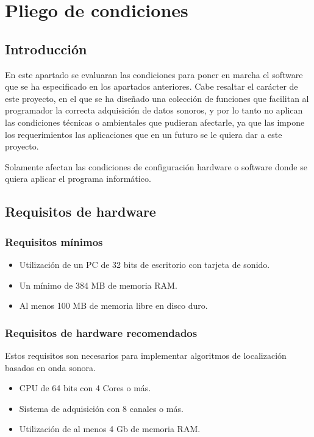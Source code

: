 \chapter{Pliego de condiciones}
\label{cha:pliego-de-condiciones}

\section{Introducción}

En este apartado se evaluaran las condiciones para poner en marcha el software que se ha especificado en los apartados anteriores. Cabe resaltar el carácter de este proyecto, en el que se ha diseñado una colección de funciones que facilitan al programador la correcta adquisición de datos sonoros, y por lo tanto no aplican las condiciones técnicas o ambientales que pudieran afectarle, ya que las impone los requerimientos las aplicaciones que en un futuro se le quiera dar a este proyecto.

Solamente afectan las condiciones de configuración hardware o software donde se quiera aplicar el programa informático.

\section{Requisitos de hardware}

\subsection{Requisitos mínimos}
\begin{itemize}
  \item Utilización de un PC de 32 bits de escritorio con tarjeta de sonido.
  \item Un mínimo de 384 MB de memoria RAM.
  \item Al menos 100 MB de memoria libre en disco duro.
\end{itemize}

\subsection{Requisitos de hardware recomendados}
Estos requisitos son necesarios para implementar algoritmos de localización basados en onda sonora.
\begin{itemize}
  \item CPU de 64 bits con 4 Cores o más.
  \item Sistema de adquisición con 8 canales o más.
  \item Utilización de al menos 4 Gb de memoria RAM.
\end{itemize}

